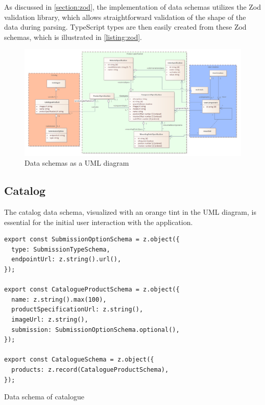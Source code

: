 As discussed in \autoref{section:zod}, the implementation of data schemas utilizes the Zod validation library, which allows straightforward validation of the shape of the data during parsing. TypeScript types are then easily created from these Zod schemas, which is illustrated in \autoref{listing:zod}. \cite{Wycliffe2023} 

\begin{landscape}
\begin{figure}[h]
\centering
\includegraphics[width=\linewidth]{images/uml_dataschema.png}
\caption{Data schemas as a UML diagram}
\label{fig:data-schema}
\end{figure}
\end{landscape}

\subsection{Catalog}

The catalog data schema, visualized with an orange tint in the UML diagram, is essential for the initial user interaction with the application.

\begin{listing}[h]
\begin{verbatim}
export const SubmissionOptionSchema = z.object({
  type: SubmissionTypeSchema,
  endpointUrl: z.string().url(),
});

export const CatalogueProductSchema = z.object({
  name: z.string().max(100),
  productSpecificationUrl: z.string(),
  imageUrl: z.string(),
  submission: SubmissionOptionSchema.optional(),
});

export const CatalogueSchema = z.object({
  products: z.record(CatalogueProductSchema),
});
\end{verbatim}
\caption{Data schema of catalogue}
\label{lisiting:schema-catalogue}
\end{listing}

